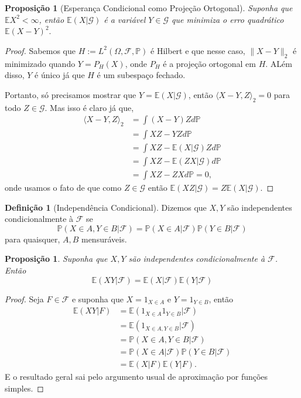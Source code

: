 \documentclass[12pt,a4paper,oneside]{book}
\newtheorem{proposition}[theorem]{Proposi\c{c}\~ao}
\theoremstyle{definition}
\newtheorem{definition}[theorem]{Defini\c{c}\~ao}
\theoremstyle{remark}
\numberwithin{equation}{section}
\newcommand{\E}{\mathbb{E}}
\newcommand{\pr}{\mathbb{P}}
\begin{document}
\begin{proposition}[Esperança Condicional como Projeção Ortogonal] Suponha que $\E X^2<\infty$, então $\E(X|\mathcal{G})$ é a variável $Y\in \mathcal{G}$ que minimiza o erro quadrático $\E(X-Y)^2.$
\end{proposition}
\begin{proof}
Sabemos que $H:=L^2(\Omega,\mathcal{F},\pr)$ é Hilbert e que nesse caso, $\|X-Y\|_2$ é minimizado quando $Y = P_{H}(X)$, onde $P_{H}$ é a projeção ortogonal em $H$. ALém disso,  $Y$ é único já que $H$ é  um subespaço fechado. 

Portanto, só precisamos mostrar que $Y = \E(X|\mathcal{G})$, então 
$\langle X-Y,Z \rangle_2 = 0$ para todo $Z\in \mathcal{G}$. Mas isso é claro já que,
\begin{align*}
\langle X-Y,Z \rangle_2 & = \int (X-Y)Z d\pr\\
& = \int XZ - YZ d\pr\\
& = \int XZ - \E(X|\mathcal{G} )Zd\pr\\
& = \int XZ - \E(ZX|\mathcal{G} )d\pr\\
& = \int XZ - ZXd\pr = 0,
\end{align*}
onde usamos o fato de que como $Z\in \mathcal{G}$ então $\E(XZ|\mathcal{G}) = Z\E(X|\mathcal{G}).$
\end{proof}



\begin{definition}[Independência Condicional] Dizemos que $X,Y$ são independentes condicionalmente à $\mathcal{F}$ se 
$$\pr(X\in A, Y\in B|\mathcal{F}) = \pr(X\in A|\mathcal{F}) \pr( Y\in B|\mathcal{F})$$
para quaisquer, $A,B$ mensuráveis.
\end{definition}



\begin{proposition}\label{prop-indpe-condc}
Suponha que $X,Y$ são independentes condicionalmente à $\mathcal{F}$. Então
$$\E(XY|\mathcal{F})= \E(X|\mathcal{F})\E(Y|\mathcal{F}) $$
\end{proposition}
\begin{proof}
Seja $F\in \mathcal{F}$ e suponha que $X=1_{X\in A}$ e $Y=1_{Y\in B}$, então
\begin{align*}
\E(XY|F) &= \E(1_{X\in A}1_{Y\in B}|\mathcal{F})  \\
&=\E(1_{X\in A,Y\in B}|\mathcal{F})\\
&=\pr(X\in A, Y\in B|\mathcal{F})\\ 
&= \pr(X\in A|\mathcal{F}) \pr( Y\in B|\mathcal{F})\\
&= \E(X|F)\E(Y|F).
\end{align*}
E o resultado geral sai pelo argumento usual de aproximação por funções simples.
\end{proof}
\end{document}
